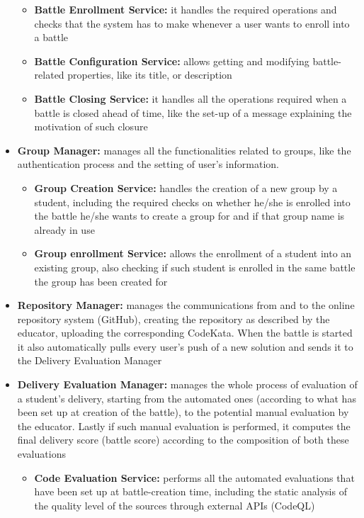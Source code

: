 \documentclass[../DD.tex]{subfiles}
\begin{document}
\begin{itemize}
\begin{itemize}
            \item \textbf{Battle Enrollment Service:} it handles the required operations and checks that the system has to make whenever a user wants to enroll into a battle
            \item \textbf{Battle Configuration Service:} allows getting and modifying battle-related properties, like its title, or description
            \item \textbf{Battle Closing Service:} it handles all the operations required when a battle is closed ahead of time, like the set-up of a message explaining the motivation of such closure
        \end{itemize}
        \item \textbf{Group Manager:} manages all the functionalities related to groups, like the authentication process and the setting of user's information.
        \begin{itemize}
            \item \textbf{Group Creation Service:} handles the creation of a new group by a student, including the required checks on whether he/she is enrolled into the battle he/she wants to create a group for and if that group name is already in use 
            \item \textbf{Group enrollment Service:} allows the enrollment of a student into an existing group, also checking if such student is enrolled in the same battle the group has been created for
        \end{itemize}
        \item \textbf{Repository Manager:} manages the communications from and to the online repository system (GitHub), creating the repository as described by the educator, uploading the corresponding CodeKata. When the battle is started it also automatically pulls every user's push of a new solution and sends it to the Delivery Evaluation Manager
        \item \textbf{Delivery Evaluation Manager:} manages the whole process of evaluation of a student's delivery, starting from the automated ones (according to what has been set up at creation of the battle), to the potential manual evaluation by the educator. Lastly if such manual evaluation is performed, it computes the final delivery score (battle score) according to the composition of both these evaluations
        \begin{itemize}
            \item \textbf{Code Evaluation Service:} performs all the automated evaluations that have been set up at battle-creation time, including the static analysis of the quality level of the sources through external APIs (CodeQL)

\end{itemize}
\end{itemize}
\end{document}
